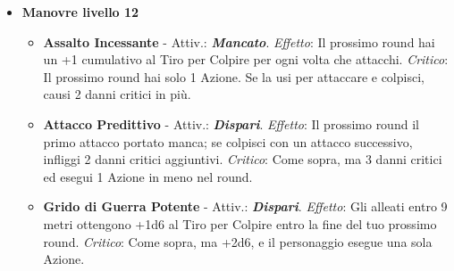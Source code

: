 \begin{multicols}{2}
\begin{itemize}[leftmargin=*]
\begin{itemize}[leftmargin=*]
		\item \textbf{Intimidazione Superiore} - Attiv.: \textbf{\emph{Dispari}}. \emph{Effetto}: L'avversario subisce -4 al primo attacco contro di te entro la fine del prossimo round. \emph{Critico}: Entro la fine del prossimo round, l'avversario in mischia non può infliggere danni critici contro di te.

		\item \textbf{Ferita Sanguinante} - Attiv.: \textbf{\emph{Pari}}. \emph{Effetto}: L'avversario subisce +1 al sanguinamento. \emph{Critico}: +2 al sanguinamento e il personaggio subisce danni pari al modificatore di Forza.

		\item \textbf{Valutazione Strategica} - Attiv.: \textbf{\emph{Pari}}. \emph{Effetto}: Il prossimo attacco a segno entro la fine del prossimo round infligge un danno critico in più. \emph{Critico}: Come sopra, ma infligge due danni critici; il round successivo esegui un'Azione in meno.
	\end{itemize}


\begin{narratore}
		Invitate il giocatore a creare un suo stile di \emph{fallimento}, fatelo gioire di un \emph{fumble}!
\end{narratore}

	\item \textbf{Manovre livello 12}
	\begin{itemize}[leftmargin=*]
		\setlength{\itemsep}{0pt}
		\item \textbf{Assalto Incessante} - Attiv.: \textbf{\emph{Mancato}}. \emph{Effetto}: Il prossimo round hai un +1 cumulativo al Tiro per Colpire per ogni volta che attacchi. \emph{Critico}: Il prossimo round hai solo 1 Azione. Se la usi per attaccare e colpisci, causi 2 danni critici in più.

		\item \textbf{Attacco Predittivo} - Attiv.: \textbf{\emph{Dispari}}. \emph{Effetto}: Il prossimo round il primo attacco portato manca; se colpisci con un attacco successivo, infliggi 2 danni critici aggiuntivi. \emph{Critico}: Come sopra, ma 3 danni critici ed esegui 1 Azione in meno nel round.

		\item \textbf{Grido di Guerra Potente} - Attiv.: \textbf{\emph{Dispari}}. \emph{Effetto}: Gli alleati entro 9 metri ottengono +1d6 al Tiro per Colpire entro la fine del tuo prossimo round. \emph{Critico}: Come sopra, ma +2d6, e il personaggio esegue una sola Azione.


\end{itemize}
\end{itemize}
\end{multicols}
